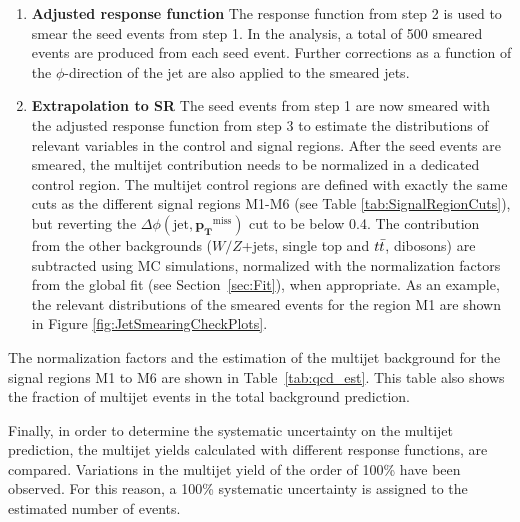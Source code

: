 \begin{enumerate}
\item{\textbf{Adjusted response function}} The response function from step 2 is used to smear the seed events from step 1.
In the analysis, a total of 500 smeared events are produced from each seed event.
Further corrections as a function of the $\phi$-direction of the jet are also applied to the smeared jets.

\item{\textbf{Extrapolation to SR}} The seed events from step 1 are now smeared with the adjusted response function from step 3 to estimate the distributions of relevant variables in the control and signal regions.
After the seed events are smeared, the multijet contribution needs to be normalized in a dedicated control region.
The multijet control regions are defined with exactly the same cuts as the different signal regions M1-M6 (see Table \ref{tab:SignalRegionCuts}), but reverting the $\Delta\phi(\text{jet}, \mathbf{p_{T}}^\text{miss})$ cut to be below 0.4.
The contribution from the other backgrounds ($W/Z$+jets, single top and $t\bar{t}$, dibosons) are subtracted using MC simulations, normalized with the normalization factors from the global fit (see Section~\ref{sec:Fit}), when appropriate.
As an example, the relevant distributions of the smeared events for the region M1 are shown in Figure \ref{fig:JetSmearingCheckPlots}.

\end{enumerate}

The normalization factors and the estimation of the multijet background for the signal regions M1 to M6 are shown in Table~\ref{tab:qcd_est}.
This table also shows the fraction of multijet events in the total background prediction.

Finally, in order to determine the systematic uncertainty on the multijet prediction, the multijet yields calculated with different response functions, are compared.
Variations in the multijet yield of the order of 100\% have been observed.
For this reason, a 100\% systematic uncertainty is assigned to the estimated number of events.



